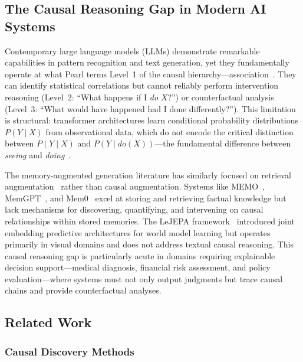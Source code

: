 \documentclass[11pt,a4paper]{article}
\begin{document}
\subsection{The Causal Reasoning Gap in Modern AI Systems}

Contemporary large language models (LLMs) demonstrate remarkable capabilities in pattern recognition and text generation, yet they fundamentally operate at what Pearl terms Level~1 of the causal hierarchy---association~\cite{pearl2009}. They can identify statistical correlations but cannot reliably perform intervention reasoning (Level~2: ``What happens if I \textit{do} \(X\)?'') or counterfactual analysis (Level~3: ``What would have happened had I done differently?''). This limitation is structural: transformer architectures learn conditional probability distributions \(P(Y \mid X)\) from observational data, which do not encode the critical distinction between \(P(Y \mid X)\) and \(P(Y \mid do(X))\)---the fundamental difference between \textit{seeing} and \textit{doing}~\cite{pearl2018}.

The memory-augmented generation literature has similarly focused on retrieval augmentation~\cite{lewis2020,guu2020,borgeaud2022} rather than causal augmentation. Systems like MEMO~\cite{memo2025}, MemGPT~\cite{packer2023}, and Mem0~\cite{mem0} excel at storing and retrieving factual knowledge but lack mechanisms for discovering, quantifying, and intervening on causal relationships within stored memories. The LeJEPA framework~\cite{lejepa2025} introduced joint embedding predictive architectures for world model learning but operates primarily in visual domains and does not address textual causal reasoning. This causal reasoning gap is particularly acute in domains requiring explainable decision support---medical diagnosis, financial risk assessment, and policy evaluation---where systems must not only output judgments but trace causal chains and provide counterfactual analyses.

\subsection{Related Work}

\subsubsection{Causal Discovery Methods}
\end{document}
